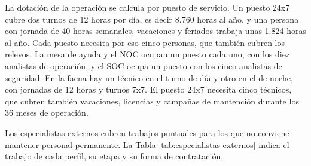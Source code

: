 \documentclass[anexo]{../../comun/overfore}
\begin{document}
La dotación de la operación se calcula por puesto de servicio. Un puesto 24x7 cubre dos turnos de 12 horas por día, es decir 8.760 horas al año, y una persona con jornada de 40 horas semanales, vacaciones y feriados trabaja unas 1.824 horas al año. Cada puesto necesita por eso cinco personas, que también cubren los relevos. La mesa de ayuda y el NOC ocupan un puesto cada uno, con los diez analistas de operación, y el SOC ocupa un puesto con los cinco analistas de seguridad. En la faena hay un técnico en el turno de día y otro en el de noche, con jornadas de 12 horas y turnos 7x7. El puesto 24x7 necesita cinco técnicos, que cubren también vacaciones, licencias y campañas de mantención durante los 36 meses de operación.

Los especialistas externos cubren trabajos puntuales para los que no conviene mantener personal permanente. La Tabla \ref{tab:especialistas-externos} indica el trabajo de cada perfil, su etapa y su forma de contratación.
\end{document}
